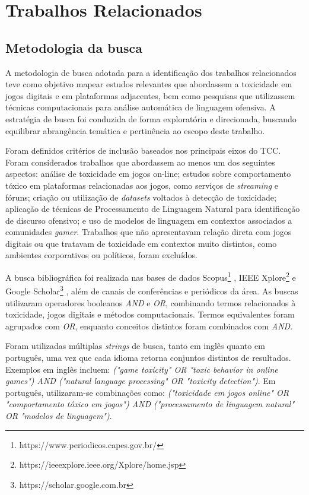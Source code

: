 \documentclass{eic-bcc-tcc}
\begin{document}
\section{Trabalhos Relacionados}

\subsection{Metodologia da busca}

A metodologia de busca adotada para a identificação dos trabalhos relacionados teve como objetivo mapear estudos relevantes que abordassem a toxicidade em jogos digitais e em plataformas adjacentes, bem como pesquisas que utilizassem técnicas computacionais para análise automática de linguagem ofensiva. A estratégia de busca foi conduzida de forma exploratória e direcionada, buscando equilibrar abrangência temática e pertinência ao escopo deste trabalho.

Foram definidos critérios de inclusão baseados nos principais eixos do TCC. Foram considerados trabalhos que abordassem ao menos um dos seguintes aspectos: análise de toxicidade em jogos on-line; estudos sobre comportamento tóxico em plataformas relacionadas aos jogos, como serviços de \textit{streaming} e fóruns; criação ou utilização de \textit{datasets} voltados à detecção de toxicidade; aplicação de técnicas de Processamento de Linguagem Natural para identificação de discurso ofensivo; e uso de modelos de linguagem em contextos associados a comunidades \textit{gamer}. Trabalhos que não apresentavam relação direta com jogos digitais ou que tratavam de toxicidade em contextos muito distintos, como ambientes corporativos ou políticos, foram excluídos.

A busca bibliográfica foi realizada nas bases de dados Scopus\footnote{https://www.periodicos.capes.gov.br/}
, IEEE Xplore\footnote{https://ieeexplore.ieee.org/Xplore/home.jsp}
 e Google Scholar\footnote{https://scholar.google.com.br}
, além de canais de conferências e periódicos da área. As buscas utilizaram operadores booleanos \textit{AND} e \textit{OR}, combinando termos relacionados à toxicidade, jogos digitais e métodos computacionais. Termos equivalentes foram agrupados com \textit{OR}, enquanto conceitos distintos foram combinados com \textit{AND}.

Foram utilizadas múltiplas \textit{strings} de busca, tanto em inglês quanto em português, uma vez que cada idioma retorna conjuntos distintos de resultados. Exemplos em inglês incluem: \textit{("game toxicity" OR "toxic behavior in online games") AND ("natural language processing" OR "toxicity detection")}. Em português, utilizaram-se combinações como: \textit{("toxicidade em jogos online" OR "comportamento tóxico em jogos") AND ("processamento de linguagem natural" OR "modelos de linguagem")}.
\end{document}

